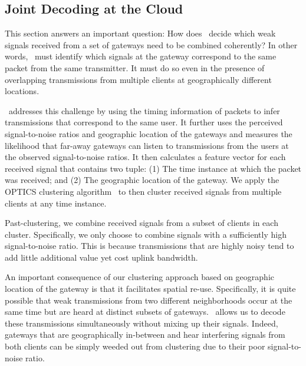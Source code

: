 




\subsection{Joint Decoding at the Cloud}
\label{sec:joint-decoding-cloud}
This section answers an important question: How does \name\ decide which weak signals received from a set of gateways need to be combined coherently? In other words, \name\ must identify which signals at the gateway correspond to the same packet from the same transmitter. It must do so even in the presence of overlapping transmissions from multiple clients at geographically different locations. \vspace*{0.1in}

 \name\ addresses this challenge by using the timing information of packets to infer transmissions that correspond to the same user. It further uses the perceived signal-to-noise ratios and geographic location of the gateways and measures the likelihood that far-away gateways can listen to transmissions from the users at the observed signal-to-noise ratios. It then calculates a feature vector for each received signal that contains two tuple: (1) The time instance at which the packet was received; and (2) The geographic location of the gateway. We apply the OPTICS clustering algorithm~\cite{ankerst1999optics} to then cluster received signals from multiple clients at any time instance. 

Past-clustering, we combine received signals from a subset of clients in each cluster. Specifically, we only choose to combine signals with a sufficiently high signal-to-noise ratio. This is because transmissions that are highly noisy tend to add little additional value yet cost uplink bandwidth. 

An important consequence of our clustering approach based on geographic location of the gateway is that it facilitates spatial re-use. Specifically, it is quite possible that weak transmissions from two different neighborhoods occur at the same time but are heard at distinct subsets of gateways. \name\ allows us to decode these transmissions simultaneously without mixing up their signals. Indeed, gateways that are geographically in-between and hear interfering signals from both clients can be simply weeded out from clustering due to their poor signal-to-noise ratio. 

